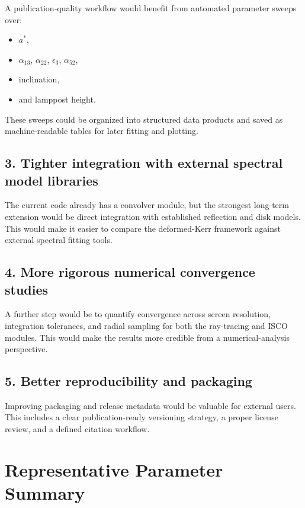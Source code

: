 \documentclass[11pt]{article}
\begin{document}
A publication-quality workflow would benefit from automated parameter sweeps over:

\begin{itemize}[leftmargin=1.5em]
    \item $a^*$,
    \item $\alpha_{13}$, $\alpha_{22}$, $\epsilon_3$, $\alpha_{52}$,
    \item inclination,
    \item and lamppost height.
\end{itemize}

These sweeps could be organized into structured data products and saved as machine-readable tables for later fitting and plotting.

\subsection{3. Tighter integration with external spectral model libraries}

The current code already has a convolver module, but the strongest long-term extension would be direct integration with established reflection and disk models. This would make it easier to compare the deformed-Kerr framework against external spectral fitting tools.

\subsection{4. More rigorous numerical convergence studies}

A further step would be to quantify convergence across screen resolution, integration tolerances, and radial sampling for both the ray-tracing and ISCO modules. This would make the results more credible from a numerical-analysis perspective.

\subsection{5. Better reproducibility and packaging}

Improving packaging and release metadata would be valuable for external users. This includes a clear publication-ready versioning strategy, a proper license review, and a defined citation workflow.

\section{Representative Parameter Summary}
\end{document}
